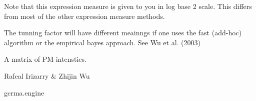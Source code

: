 \begin{Details}\relax
Note that this expression measure is given to you in log base 2
scale. This differs from most of the other expression measure
methods.

The tunning factor  will have different meainngs if one uses
the fast (add-hoc) algorithm or the empirical bayes approach. See Wu
et al. (2003)
\end{Details}
\begin{Value}
A matrix of PM intensties.
\end{Value}
\begin{Author}\relax
Rafeal Irizarry \& Zhijin Wu
\end{Author}
\begin{SeeAlso}\relax
gcrma.engine
\end{SeeAlso}

